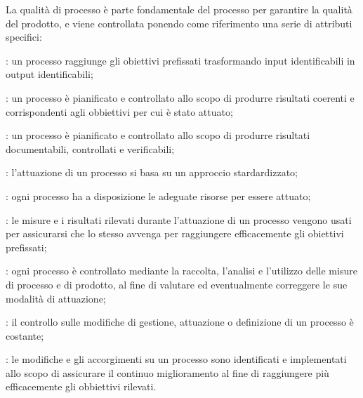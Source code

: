 La qualità di processo è parte fondamentale del processo per garantire la qualità del prodotto, e viene controllata ponendo come riferimento una serie di attributi specifici:

\begin{description}
\item {}: un processo raggiunge gli obiettivi prefissati trasformando input identificabili in output identificabili;

\item {}: un processo è pianificato e controllato allo scopo di produrre risultati coerenti e corrispondenti agli obbiettivi per cui è stato attuato;

\item {}: un processo è pianificato e controllato allo scopo di produrre risultati documentabili, controllati e verificabili;

\item {}: l'attuazione di un processo si basa su un approccio stardardizzato;

\item {}: ogni processo ha a disposizione le adeguate risorse per essere attuato;

\item {}: le misure e i risultati rilevati durante l'attuazione di un processo vengono usati per assicurarsi che lo stesso avvenga per raggiungere efficacemente gli obiettivi prefissati;

\item {}: ogni processo è controllato mediante la raccolta, l'analisi e l'utilizzo delle misure di processo e di prodotto, al fine di valutare ed eventualmente correggere le sue modalità di attuazione;

\item {}: il controllo sulle modifiche di gestione, attuazione o definizione di un processo è costante;

\item {}: le modifiche e gli accorgimenti su un processo sono identificati e implementati allo scopo di assicurare il continuo miglioramento al fine di raggiungere più efficacemente gli obbiettivi rilevati.
\end{description}

